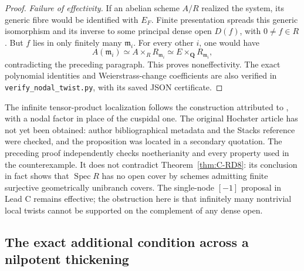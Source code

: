 \begin{proof}
\emph{Failure of effectivity.} If an abelian scheme $A/R$ realized the
system, its generic fibre would be identified with $E_F$. Finite
presentation spreads this generic isomorphism and its inverse to
some principal dense open $D(f)$, with $0\ne f\in R$. But $f$ lies
in only finitely many $\mathfrak m_i$. For every other $i$, one would
have
\[
 A(\mathfrak m_i)\simeq A\times_RR_{\mathfrak m_i}
   \simeq E\times_{\mathbf Q}R_{\mathfrak m_i},
\]
contradicting the preceding paragraph. This proves noneffectivity. The exact polynomial identities and
Weierstrass-change coefficients are also verified in
\texttt{verify\_nodal\_twist.py}, with its saved JSON certificate.
\end{proof}

\begin{remark}\label{auto:C:3a7ebde95252}

The infinite tensor-product localization follows the construction
attributed to \cite[Proposition~1 and Example~1]{Hochster1973Loci},
with a nodal factor in place of the cuspidal one. The original
Hochster article has not yet been obtained: author bibliographical
metadata and the Stacks reference were checked, and the proposition
was located in a secondary quotation. The preceding proof independently
checks noetherianity and every property used in the counterexample.
It does not contradict Theorem~\ref{thm:C-RD8}: its conclusion in fact
shows that $\operatorname{Spec}R$ has no open cover by schemes admitting
finite surjective geometrically unibranch covers. The single-node
$[-1]$ proposal in Lead C remains effective; the obstruction here is
that infinitely many nontrivial local twists cannot be supported on
the complement of any dense open.
\end{remark}


\subsection{The exact additional condition across a nilpotent thickening}

